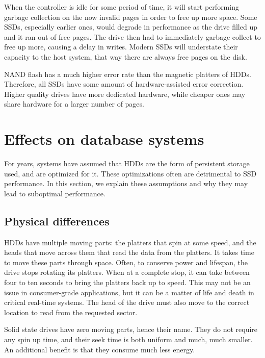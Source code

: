 \documentclass[format=acmsmall, review=false, screen=true]{acmart}
\begin{document}
When the controller is idle for some period of time, it will start performing garbage collection on the now invalid pages 
in order to free up more space. Some SSDs, especially earlier ones, would degrade in performance as the drive filled up 
and it ran out of free pages. The drive then had to immediately garbage collect to free up more, causing a delay in writes. 
Modern SSDs will understate their capacity to the host system, that way there are always free pages on the disk. 
\cite{Dirik2009, Cornwell2012, Micheloni2013, MatejFucek2014, Chen2016}

NAND flash has a much higher error rate than the magnetic platters of HDDs. Therefore, all SSDs have some amount of 
hardware-assisted error correction. Higher quality drives have more dedicated hardware, while cheaper ones may share 
hardware for a larger number of pages. \cite{Dirik2009, Cornwell2012, Micheloni2013, MatejFucek2014, Chen2016}

\section{Effects on database systems}

For years, systems have assumed that HDDs are the form of persistent storage used, and are optimized for it. These 
optimizations often are detrimental to SSD performance. In this section, we explain these assumptions and why they 
may lead to suboptimal performance.

\subsection{Physical differences}

HDDs have multiple moving parts: the platters that spin at some speed, and the heads that move across them that read the 
data from the platters. It takes time to move these parts through space. Often, to conserve power and lifespan, the drive 
stops rotating its platters. When at a complete stop, it can take between four to ten seconds to bring the platters back 
up to speed. This may not be an issue in consumer-grade applications, but it can be a matter of life and death in critical
real-time systems. \cite{MatejFucek2014} The head of the drive must also move to the correct location to read from the 
requested sector. \cite{Cornwell2012}

Solid state drives have zero moving parts, hence their name. They do not require any spin up time, and their seek time is 
both uniform and much, much smaller. An additional benefit is that they consume much less energy. 
\cite{Cornwell2012, Micheloni2013, MatejFucek2014}
\end{document}
